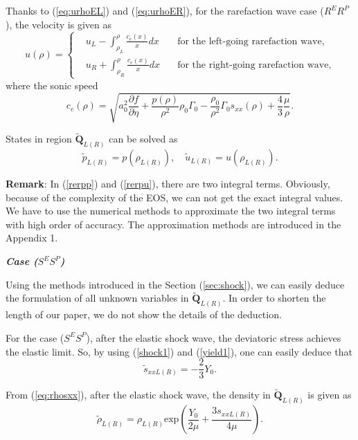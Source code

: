 \documentclass{article}
\numberwithin{equation}{section}
\numberwithin{table}{section}
\begin{document}
Thanks to (\ref{eq:urhoEL}) and (\ref{eq:urhoER}), for the rarefaction wave case ($R^{E}R^{P}$), the velocity is given as
\begin{equation} \label{rerpu}
  u(\rho) =\left\{ \begin{aligned}
	&u_L - \int_{\rho_L}^{\rho} \frac{c_e(x)}{x} dx \quad  & \text{for the  left-going rarefaction wave}
 , \\
 &u_R + \int_{\rho_R}^{\rho} \frac{c_e(x)}{x} dx \quad &  \text{for the right-going rarefaction wave} ,
	\end{aligned}
  \right. %
\end{equation}
where the sonic speed
\begin{equation}
  c_e(\rho) =
	  \sqrt{a_0^2 \frac{\partial f}{\partial \eta} + \frac{p(\rho)}{\rho^2}\rho_0\Gamma_0 -\frac{\rho_0}{\rho^2}\Gamma_0 s_{xx}(\rho) +\frac{4}{3}\frac{\mu}{\rho}}. %
\end{equation}

States in region $\tilde{\mathbf{Q}}_{L(R)}$ can be solved as
\begin{equation}
  \tilde{p}_{L(R)} = p(\rho_{L(R)}), \quad \tilde{u}_{L(R)} = u(\rho_{L(R)}).
\end{equation}

\textbf{Remark}:  In (\ref{rerpp}) and (\ref{rerpu}), there are two integral terms. Obviously, because of the complexity of the EOS, we can not get the exact integral values. We have to use the numerical methods to approximate the two integral terms with high order of accuracy. The approximation methods are introduced in the Appendix 1. 


\emph{\textbf{Case ($S^{E}S^{P}$)}}

Using the methods introduced in  the Section (\ref{sec:shock}), we can easily deduce the formulation of all unknown variables in $\tilde{\mathbf{Q}}_{L(R)}$. In order to shorten the length of our paper, we do not show the details of the deduction.

For the case ($S^{E}S^{P}$), after the elastic shock wave, the deviatoric stress achieves the elastic limit. So, by using (\ref{shock1}) and (\ref{yield1}), one can easily deduce that
\begin{equation*}
\tilde{s}_{xxL(R)} = -\frac{2}{3}Y_0.
\end{equation*}

From (\ref{eq:rhosxx}), after the elastic shock wave, the density in $\tilde{\mathbf{Q}}_{L(R)}$ is given as
\begin{equation*}
\tilde{\rho}_{L(R)} = \rho_{L(R)} \text{exp}\left(\frac{Y_0}{2\mu}+\frac{3 s_{xxL(R)}}{4\mu}\right).
\end{equation*}
\end{document}
